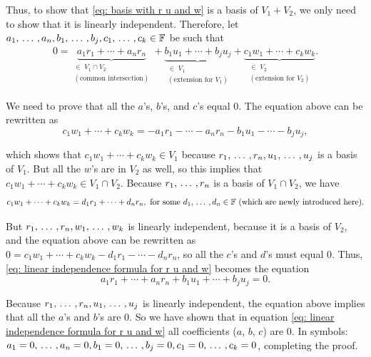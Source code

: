 \begin{prf}
Thus, to show that \eqref{eq: basis with r u and w} is a basis of $V_1 + V_2$, we only need to show that it is linearly independent. Therefore, let $a_1, {\, \ldots \,\,}, a_n, b_1, {\, \ldots \,\,}, b_j, c_1, {\, \ldots \,\,}, c_k \in \mathbb{F}$ be such that
\begin{equation}
  \label{eq: linear independence formula for r u and w}
  \begin{aligned}
    0 = \underbrace{a_1 r_1 + \cdots + a_n r_n}_{\substack{\in \; V_1 \cap V_2 \\ (\text{common intersection})}}
    + \underbrace{b_1 u_1 + \cdots + b_j u_j}_{\substack{\in \; V_1 \\ (\text{extension for } V_1 )}}
    + \underbrace{c_1 w_1 + \cdots + c_k w_k}_{\substack{\in \; V_2 \\ (\text{extension for } V_2 ) }}.
  \end{aligned}
\end{equation}

We need to prove that all the $a$'s, $b$'s, and $c$'s equal $0$. The equation above can be rewritten as
\begin{equation}
  c_1 w_1 + \cdots + c_k w_k = - a_1 r_1 - \cdots - a_n r_n - b_1 u_1 - \cdots - b_j u_j,
\end{equation}

which shows that $c_1 w_1 + \cdots + c_k w_k \in V_1$ because $r_1, {\, \ldots \,\,}, r_n, u_1, {\, \ldots \,\,}, u_j$ is a basis of $V_1$. But all the $w$'s are in $V_2$ as well, so this implies that $c_1 w_1 + \cdots + c_k w_k \in V_1 \cap V_2$. Because $r_1, {\, \ldots \,\,}, r_n$ is a basis of $V_1 \cap V_2$, we have
\begin{equation}
  c_1 w_1 + \cdots + c_k w_k = d_1 r_1 + \cdots + d_n r_n, \text{ for some } d_1, {\, \ldots \,\,}, d_n \in \mathbb{F} \text{ (which are newly introduced here)}.
\end{equation}

But $r_1, {\, \ldots \,\,}, r_n, w_1, {\, \ldots \,\,}, w_k$ is linearly independent, because it is a basis of $V_2$, and the equation above can be rewritten as $0 = c_1 w_1 + \cdots + c_k w_k - d_1 r_1 - \cdots - d_n r_n$, so all the $c$'s and $d$'s must equal $0$. Thus, \eqref{eq: linear independence formula for r u and w} becomes the equation
\begin{equation}
  a_1 r_1 + \cdots + a_n r_n + b_1 u_1 + \cdots + b_j u_j = 0.
\end{equation}

Because $r_1, {\, \ldots \,\,}, r_n, u_1, {\, \ldots \,\,}, u_j$ is linearly independent, the equation above implies that all the $a$'s and $b$'s are $0$. So we have shown that in equation \eqref{eq: linear independence formula for r u and w} all coefficients ($a$, $b$, $c$) are $0$. In symbols: $a_1 = 0, {\, \ldots \,\,}, a_n = 0, b_1 = 0, {\, \ldots \,\,}, b_j = 0, c_1 = 0, {\, \ldots \,\,}, c_k = 0$,
completing the proof.
\end{prf}

